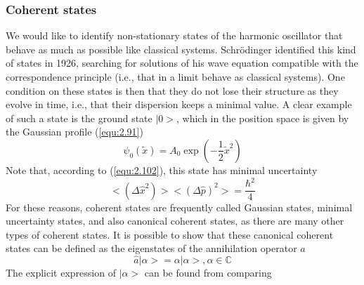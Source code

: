 \subsubsection{Coherent states}
We would like to identify non-stationary states of the
harmonic oscillator that behave as much as possible like
classical systems. Schrödinger identified this kind of
states in 1926, searching for solutions of his wave equation
compatible with the correspondence principle (i.e., that in
a limit behave as classical systems). One condition on these
states is then that they do not lose their structure as they
evolve in time, i.e., that their dispersion keeps a minimal
value. A clear example of such a state is the ground state
$|0>$, which in the position space is given by the Gaussian
profile (\ref{equ:2.91})
$$
 \psi_0 (\tilde{x}) = A_0 \exp(-\frac{1}{2}\tilde{x}^2)
$$
Note that, according to (\ref{equ:2.102}), this state has
minimal uncertainty
$$
<(\Delta \hat{x}^2)><(\Delta \hat{p})^2> = \frac{\hbar^2}{4}
$$
For these reasons, coherent states are frequently called
Gaussian states, minimal uncertainty states, and also
canonical coherent states, as there are many other types of
coherent states.
It is possible to show that these canonical coherent states
can be defined as the eigenstates of the annihilation
operator $\hat{a}$
\begin{equation}
  \hat{a}|\alpha> = \alpha|\alpha>, \alpha \in \mathbb{C}
  \label{equ:2.106}
\end{equation}
The explicit expression of $|\alpha>$ can be found from
comparing

